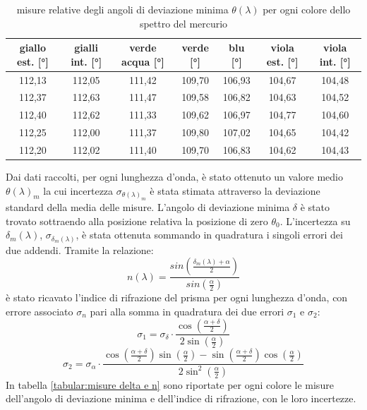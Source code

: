 \documentclass{article}
\begin{document}
        \begin{table}[H]

            \centering
            \begin{tabular}{c c c c c c c}

                \toprule 
                \textbf{giallo est.} [°] & \textbf{gialli int.} [°]& \textbf{verde acqua} [°]& 
                \textbf{verde} [°]& \textbf{blu} [°]& \textbf{viola est.} [°]& \textbf{viola int.} [°]  \\
                
                \midrule
                112,13	&	112,05	&	111,42	&	109,70	&	106,93	&	104,67	&	104,48\\
                112,37	&	112,63	&	111,47	&	109,58	&	106,82	&	104,63	&	104,52\\
                112,40	&	112,62	&	111,33	&	109,62	&	106,97	&	104,77	&	104,60\\
                112,25	&	112,00	&	111,37	&	109,80	&	107,02	&	104,65	&	104,42\\
                112,20	&	112,02	&	111,40	&	109,70	&	106,83	&	104,62	&	104,43\\
                \bottomrule

            \end{tabular}

            \caption{misure relative degli angoli di deviazione minima $\theta(\lambda)$ per ogni colore dello spettro del mercurio}
            \label{tabular:theta misure}

        \end{table}

        Dai dati raccolti, per ogni lunghezza d'onda, è stato ottenuto un valore medio $\theta(\lambda)_m$ la cui incertezza $\sigma_{\theta(\lambda)_m}$ 
        è stata stimata attraverso la deviazione standard della media delle misure. L'angolo di deviazione minima $\delta$ è stato trovato sottraendo 
        alla posizione relativa la posizione di zero $\theta_0$. L'incertezza su $\delta_m(\lambda)$, $\sigma_{\delta_m(\lambda)}$, è stata ottenuta sommando 
        in quadratura i singoli errori dei due addendi. Tramite la relazione:
        \[n(\lambda) = \frac{sin(\frac{\delta_m(\lambda) + \alpha}{2})}{sin(\frac{\alpha}{2})}\]
        è stato ricavato l'indice di rifrazione del prisma per ogni lunghezza d'onda, con errore associato $\sigma_n$ pari alla somma in quadratura 
        dei due errori $\sigma_1$ e $\sigma_2$:
        \[\sigma_1 = \sigma_{\delta} \cdot \frac{\cos(\frac{\alpha + \delta}{2})}{2\sin(\frac{\alpha}{2})} \]
        \[\sigma_2 = \sigma_{\alpha}\cdot \frac{\cos(\frac{\alpha + \delta}{2})\sin(\frac{\alpha}{2}) - 
                    \sin(\frac{\alpha + \delta}{2})\cos(\frac{\alpha}{2})}{2\sin^2(\frac{\alpha}{2})} \]
        In tabella \ref{tabular:misure delta e n} sono riportate per ogni colore le misure dell'angolo di deviazione minima e dell'indice di rifrazione, con le loro incertezze.    
\end{document}
